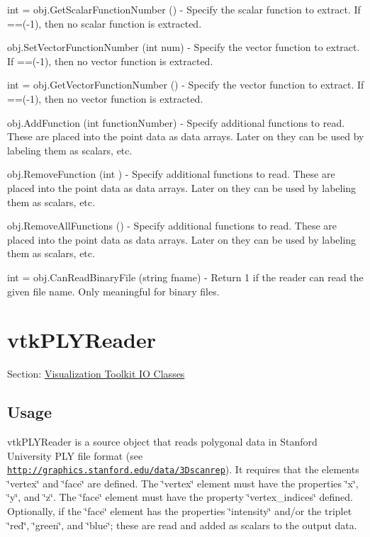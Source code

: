 \begin{DoxyItemize}
\item {\ttfamily int = obj.\-Get\-Scalar\-Function\-Number ()} -\/ Specify the scalar function to extract. If ==(-\/1), then no scalar function is extracted.  
\item {\ttfamily obj.\-Set\-Vector\-Function\-Number (int num)} -\/ Specify the vector function to extract. If ==(-\/1), then no vector function is extracted.  
\item {\ttfamily int = obj.\-Get\-Vector\-Function\-Number ()} -\/ Specify the vector function to extract. If ==(-\/1), then no vector function is extracted.  
\item {\ttfamily obj.\-Add\-Function (int function\-Number)} -\/ Specify additional functions to read. These are placed into the point data as data arrays. Later on they can be used by labeling them as scalars, etc.  
\item {\ttfamily obj.\-Remove\-Function (int )} -\/ Specify additional functions to read. These are placed into the point data as data arrays. Later on they can be used by labeling them as scalars, etc.  
\item {\ttfamily obj.\-Remove\-All\-Functions ()} -\/ Specify additional functions to read. These are placed into the point data as data arrays. Later on they can be used by labeling them as scalars, etc.  
\item {\ttfamily int = obj.\-Can\-Read\-Binary\-File (string fname)} -\/ Return 1 if the reader can read the given file name. Only meaningful for binary files.  
\end{DoxyItemize}\hypertarget{vtkio_vtkplyreader}{}\section{vtk\-P\-L\-Y\-Reader}\label{vtkio_vtkplyreader}
Section\-: \hyperlink{sec_vtkio}{Visualization Toolkit I\-O Classes} \hypertarget{vtkwidgets_vtkxyplotwidget_Usage}{}\subsection{Usage}\label{vtkwidgets_vtkxyplotwidget_Usage}
vtk\-P\-L\-Y\-Reader is a source object that reads polygonal data in Stanford University P\-L\-Y file format (see \href{http://graphics.stanford.edu/data/3Dscanrep}{\tt http\-://graphics.\-stanford.\-edu/data/3\-Dscanrep}). It requires that the elements \char`\"{}vertex\char`\"{} and \char`\"{}face\char`\"{} are defined. The \char`\"{}vertex\char`\"{} element must have the properties \char`\"{}x\char`\"{}, \char`\"{}y\char`\"{}, and \char`\"{}z\char`\"{}. The \char`\"{}face\char`\"{} element must have the property \char`\"{}vertex\-\_\-indices\char`\"{} defined. Optionally, if the \char`\"{}face\char`\"{} element has the properties \char`\"{}intensity\char`\"{} and/or the triplet \char`\"{}red\char`\"{}, \char`\"{}green\char`\"{}, and \char`\"{}blue\char`\"{}; these are read and added as scalars to the output data.


